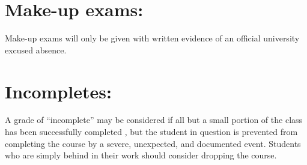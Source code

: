 \documentclass[margin]{res}
\theoremstyle{plain}
\theoremstyle{definition}
\theoremstyle{remark}
\begin{document}
\begin{resume}
\section{Make-up exams:}
Make-up exams will only be given with written evidence of an official university
excused absence. 

\section{Incompletes:}
A grade of ``incomplete'' may be considered if all but a small portion of the class has been successfully completed , but the student in question is prevented from completing the course by a severe, unexpected, and documented event. Students who are simply behind in their work should consider dropping the course.





\end{resume}
\end{document}
